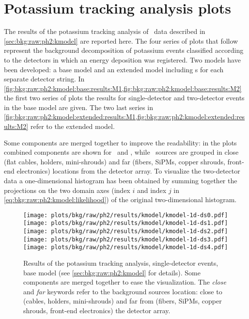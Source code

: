 
\chapter{Potassium tracking analysis plots}%
\label{apdx:kmodelplots}

The results of the potassium tracking analysis of \gerdatwo\ data described in
\cref{sec:bkg:raw:ph2:kmodel} are reported here. The four series of plots that follow
represent the background decomposition of potassium events classified according to the
detectors in which an energy deposition was registered. Two models have been developed: a
base model and an extended model including \pdf{}s for each separate detector string.  In
\cref{fig:bkg:raw:ph2:kmodel:base:results:M1,fig:bkg:raw:ph2:kmodel:base:results:M2} the
first two series of plots the results for single-detector and two-detector events in the
base model are given. The two last series in
\cref{fig:bkg:raw:ph2:kmodel:extended:results:M1,fig:bkg:raw:ph2:kmodel:extended:results:M2}
refer to the extended model.

Some components are merged together to improve the readability: in the  plots
combined components are shown for \kvz\ and \Bih, while \kvn\ sources are grouped in close
(flat cables, holders, mini-shrouds) and far (fibers, SiPMs, copper shrouds, front-end
electronics) locations from the detector array. To visualize the two-detector data a
one-dimensional histogram has been obtained by summing together the projections on the two
domain axes (index $i$ and index $j$ in \cref{eq:bkg:raw:ph2:kmodel:likelihood}) of the
original two-dimensional histogram.

\chapendgliph{}

\begin{figure}
  \centering
  \texttt{[image: plots/bkg/raw/ph2/results/kmodel/kmodel-1d-ds0.pdf]}
  \texttt{[image: plots/bkg/raw/ph2/results/kmodel/kmodel-1d-ds1.pdf]}\vspace{10pt}
  \texttt{[image: plots/bkg/raw/ph2/results/kmodel/kmodel-1d-ds2.pdf]}
  \texttt{[image: plots/bkg/raw/ph2/results/kmodel/kmodel-1d-ds3.pdf]}\vspace{10pt}
  \texttt{[image: plots/bkg/raw/ph2/results/kmodel/kmodel-1d-ds4.pdf]}
  \begin{minipage}[b][5.3cm][c]{0.45\textwidth}
    \hspace{15pt}%
    \parbox{0.91\textwidth}{%
      \caption{%
        Results of the potassium tracking analysis, single-detector events, base model (see
        \cref{sec:bkg:raw:ph2:kmodel} for details). Some components are merged together to
        ease the visualization. The \emph{close} and \emph{far} keywords refer to the
        background sources location: close to (cables, holders, mini-shrouds) and far from
        (fibers, SiPMs, copper shrouds, front-end electronics) the detector array.
      }\label{fig:bkg:raw:ph2:kmodel:base:results:M1}
    }
  \end{minipage}
\end{figure}

